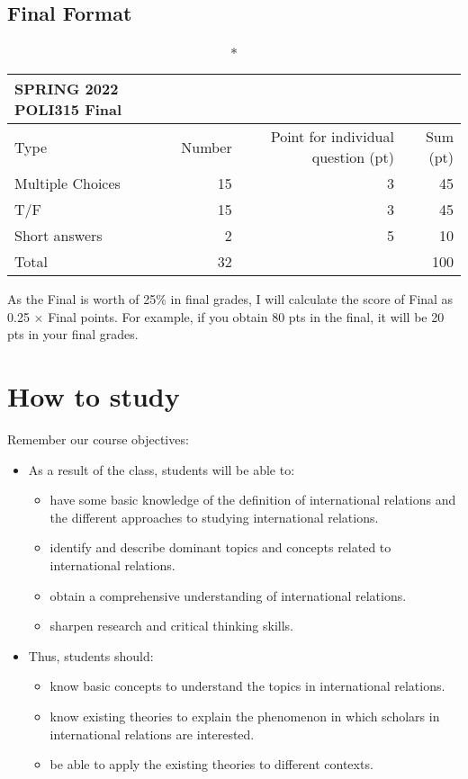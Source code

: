 \documentclass[
]{book}
\begin{document}
\hypertarget{final-format}{%
\subsection*{Final Format}\label{final-format}}

\captionsetup[table]{labelformat=empty,skip=1pt}
\begin{longtable}{lrrr}
\caption*{
{\large SPRING 2022 POLI315 Final}
} \\ 
\toprule
Type & Number & Point for individual question (pt) & Sum (pt) \\ 
\midrule
Multiple Choices & 15 & 3 & 45 \\ 
T/F & 15 & 3 & 45 \\ 
Short answers & 2 & 5 & 10 \\ 
Total & 32 &  & 100 \\ 
 \bottomrule
\end{longtable}

As the Final is worth of 25\% in final grades, I will calculate the score of Final as 0.25 \(\times\) Final points. For example, if you obtain 80 pts in the final, it will be 20 pts in your final grades.

\hypertarget{how-to-study}{%
\section*{How to study}\label{how-to-study}}

Remember our course objectives:

\begin{itemize}
\item
  As a result of the class, students will be able to:

  \begin{itemize}
  \item
    have some basic knowledge of the definition of international relations and the different approaches to studying international relations.
  \item
    identify and describe dominant topics and concepts related to international relations.
  \item
    obtain a comprehensive understanding of international relations.
  \item
    sharpen research and critical thinking skills.
  \end{itemize}
\item
  Thus, students should:

  \begin{itemize}
  \item
    know basic concepts to understand the topics in international relations.
  \item
    know existing theories to explain the phenomenon in which scholars in international relations are interested.
  \item
    be able to apply the existing theories to different contexts.
  \end{itemize}
\end{itemize}
\end{document}

